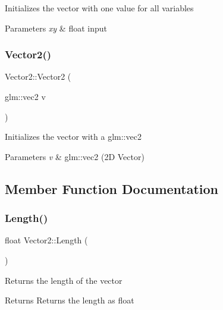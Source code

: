 Initializes the vector with one value for all variables 
\begin{DoxyParams}{Parameters}
{\em xy} & float input \\
\hline
\end{DoxyParams}
\mbox{\label{struct_vector2_a8a6a520209bbcd7db3d59f8a0c9e3b2f}} 
\subsubsection{\texorpdfstring{Vector2()}{Vector2()}\hspace{0.1cm}{\footnotesize\ttfamily [4/4]}}
{\footnotesize\ttfamily Vector2\+::\+Vector2 (\begin{DoxyParamCaption}\item[{glm\+::vec2}]{v }\end{DoxyParamCaption})\hspace{0.3cm}{\ttfamily [inline]}}

Initializes the vector with a glm\+::vec2 
\begin{DoxyParams}{Parameters}
{\em v} & glm\+::vec2 (2D Vector) \\
\hline
\end{DoxyParams}


\subsection{Member Function Documentation}
\mbox{\label{struct_vector2_ae7b80a14336e86c30a11218cd27a4abf}} 
\subsubsection{\texorpdfstring{Length()}{Length()}}
{\footnotesize\ttfamily float Vector2\+::\+Length (\begin{DoxyParamCaption}{ }\end{DoxyParamCaption})\hspace{0.3cm}{\ttfamily [inline]}}

Returns the length of the vector \begin{DoxyReturn}{Returns}
Returns the length as float 
\end{DoxyReturn}
\mbox{\label{struct_vector2_afd0eb6f05e1a15b3d8656d5e0e12798a}} 
